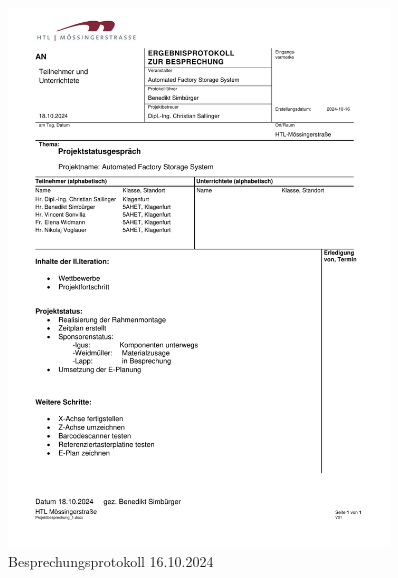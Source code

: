\begin{figure}[H]
    \includegraphics[width=0.9\textwidth]{../Protokolls/Projektbesprechung_1.pdf}
    \centering
    \caption{Besprechungsprotokoll 16.10.2024}
\end{figure}

